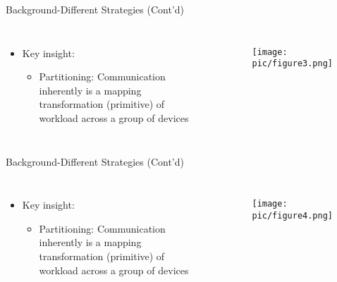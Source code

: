 \documentclass{beamer}
\begin{document}
\begin{frame}{Background-Different Strategies (Cont'd)}
    
\begin{columns}
	\begin{itemize}
		\item {Key insight:  
		}
            \begin{itemize}
                \item Partitioning: Communication inherently is a mapping transformation (primitive) of workload across a group of devices
            \end{itemize}
	\end{itemize}\
	\begin{figure}
		\centering
		\texttt{[image: pic/figure3.png]}
		\label{secert_sharing_figures}
	\end{figure}
\end{columns}
\end{frame}

\begin{frame}{Background-Different Strategies (Cont'd)}
\begin{columns}
	\begin{itemize}
		\item {Key insight:  
		}
            \begin{itemize}
                \item Partitioning: Communication inherently is a mapping transformation (primitive) of workload across a group of devices
            \end{itemize}
	\end{itemize}\
	\begin{figure}
		\centering
		\texttt{[image: pic/figure4.png]}
		\label{secert_sharing_figures}
	\end{figure}
\end{columns}
\end{frame}
\end{document}
